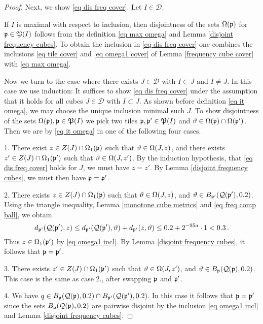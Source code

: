 {\begin{proof}
    Next, we show \eqref{eq dis freq cover}. Let $I \in \mathcal{D}$.

    If $I$ is maximal with respect to inclusion, then disjointness of the sets $\Omega(\mathfrak p)$ for $\mathfrak p \in \mathfrak P(I)$ follows from the definition \eqref{eq max omega} and Lemma \ref{disjoint frequency cubes}. To obtain the inclusion in \eqref{eq dis freq cover} one combines the inclusions \eqref{eq tile cover} and \eqref{eq omega1 cover}
    of Lemma \ref{frequency cube cover} with  \eqref{eq max omega}.

    Now we turn to the case where there exists $J \in \mathcal{D}$ with $I \subset J$ and $I\ne J$. In this case we use induction: It suffices to show \eqref{eq dis freq cover} under the assumption that it holds for all cubes $J \in \mathcal{D}$ with $I \subset J$. As shown before definition \eqref{eq it omega}, we may choose the unique inclusion minimal such $J$. To show disjointness of the sets $\Omega(\mathfrak p), \mathfrak p \in \mathfrak P(I)$ we pick two tiles $\mathfrak p, \mathfrak p' \in \mathfrak P(I)$ and $\vartheta \in \Omega(\mathfrak p) \cap \Omega(\mathfrak p')$.
    Then we are by \eqref{eq it omega} in one of the following four cases.

    1. There exist $z \in Z(J) \cap \Omega_1(\mathfrak p)$ such that $\vartheta \in \Omega(J, z)$, and there exists $z' \in Z(J) \cap \Omega_1(\mathfrak p')$ such that $\vartheta \in \Omega(J, z')$. By the induction hypothesis, that \eqref{eq dis freq cover} holds for $J$, we must have $z = z'$. By Lemma \ref{disjoint frequency cubes}, we must then have $\mathfrak p = \mathfrak p'$.

    2. There exists $z \in Z(J) \cap \Omega_1(\mathfrak p)$ such that $\vartheta \in \Omega(J,z)$, and $\vartheta \in B_{\mathfrak p'}(\mathcal{Q}(\mathfrak p'), 0.2)$.  Using the triangle inequality, Lemma \ref{monotone
    cube metrics} and \eqref{eq freq comp ball}, we obtain
    $$
        d_{\mathfrak p'}(\mathcal{Q}(\mathfrak p'),z) \le d_{\mathfrak p'}(\mathcal{Q}(\mathfrak p'), \vartheta) + d_{\mathfrak p'}(z, \vartheta) \le 0.2 + 2^{-95a} \cdot 1 < 0.3\,.
    $$
    Thus $z \in \Omega_1(\mathfrak p')$ by \eqref{eq omega1 incl}. By Lemma \ref{disjoint frequency cubes}, it follows that $\mathfrak p = \mathfrak p'$.

    3. There exists $z' \in Z(J) \cap \Omega_1(\mathfrak p')$ such that $\vartheta \in \Omega(J,z')$, and $\vartheta \in B_{\mathfrak p}(\mathcal{Q}(\mathfrak p), 0.2)$. This case is the same as case 2., after swapping $\mathfrak p$ and $\mathfrak p'$.

    4. We have $q \in B_{\mathfrak p}(\mathcal{Q}(\mathfrak p), 0.2) \cap B_{\mathfrak p'}(\mathcal{Q}(\mathfrak p'), 0.2)$. In this case it follows that $\mathfrak p = \mathfrak p'$ since the sets $B_{\mathfrak p}(\mathcal{Q}(\mathfrak p), 0.2)$ are pairwise disjoint by the inclusion \eqref{eq omega1 incl} and Lemma \ref{disjoint frequency cubes}.


\end{proof}}
